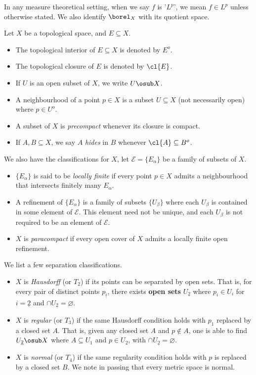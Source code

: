 \documentclass[../main-v2-manifolds.tex]{subfiles}
\begin{document}
\begin{remark}
    In any measure theoretical setting, when we say $f$ is '$L^p$', we mean $f\in L^p$ unless otherwise stated. We also identify $\borel_X$ with its quotient space.
\end{remark}
Let $X$ be a topological space, and $E\subseteq X$.
\begin{itemize}
    \item The topological interior of $E\subseteq X$ is denoted by $E^o$.
    \item The topological closure of $E$ is denoted by $\cl{E}$.
    \item If $U$ is an open subset of $X$, we write $U\osub X$. 
    \item A neighbourhood of a point $p\in X$ is a subset $U\subseteq X$ (not necessarily open) where $p\in U^o$.
    \item A subset of $X$ is \emph{precompact} whenever its closure is compact.
    \item If $A,B\subseteq X$, we say $A$ \emph{hides} in $B$ whenever $\cl{A}\subseteq B^o$.
\end{itemize}
We also have the classifications for $X$, let $\mathcal{E} = \{E_{\alpha}\}$ be a family of subsets of $X$.
\begin{itemize}
    \item $\{E_{\alpha}\}$ is said to be \emph{locally finite} if every point $p\in X$ admits a neighbourhood that intersects finitely many $E_{\alpha}$.
    \item A refinement of $\{E_{\alpha}\}$ is a family of subsets $\{U_{\beta}\}$ where each $U_{\beta}$ is contained in some element of $\mathcal{E}$. This element need not be unique, and each $U_{\beta}$ is not required to be an element of $\mathcal{E}$.
    \item $X$ is \emph{paracompact} if every open cover of $X$ admits a locally finite open refinement.
\end{itemize}
We list a few separation classifications.
\begin{itemize}
    \item $X$ is \emph{Hausdorff} (or $T_2$) if its points can be separated by open sets. That is, for every pair of distinct points $p_{\underline{i}}$, there exists \textbf{open sets} $U_{\underline{2}}$ where $p_i\in U_{i}$ for $i = \underline{2}$ and $\cap U_{\underline{2}}=\varnothing$.
    \item $X$ is \emph{regular} (or $T_3$) if the same Hausdorff condition holds with $p_1$ replaced by a closed set $A$. That is, given any closed set $A$ and $p\notin A$, one is able to find $U_{\underline{2}}\osub X$ where $A\subseteq U_1$ and $p\in U_2$, with $\cap U_{\underline{2}}=\varnothing$.
    \item $X$ is \emph{normal} (or $T_4$) if the same regularity condition holds with $p$ is replaced by a closed set $B$. We note in passing that every metric space is normal.
\end{itemize}
\end{document}
